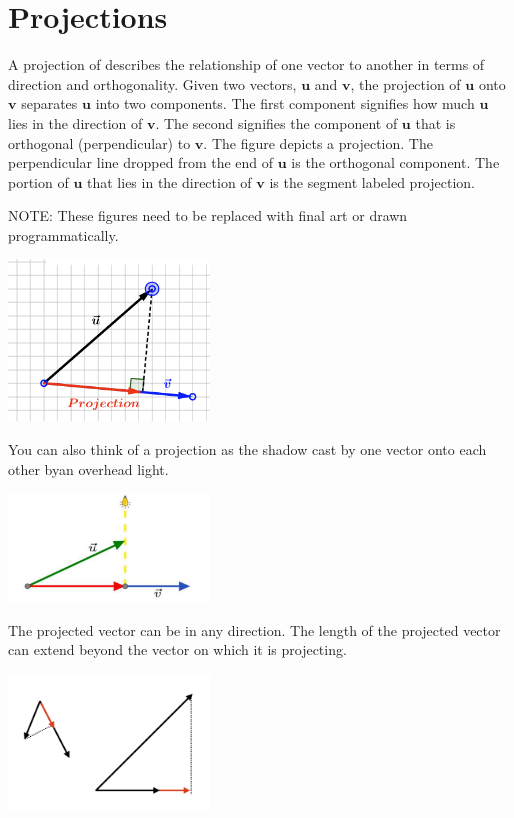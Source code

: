 \chapter{Projections}

A projection of describes the relationship of one vector to another in terms of direction and orthogonality. Given two vectors, $\mathbf{u}$ and $\mathbf{v}$, the projection of $\mathbf{u}$ onto $\mathbf{v}$ separates $\mathbf{u}$ into two components. The first component signifies how much $\mathbf{u}$ lies in the direction of $\mathbf{v}$. The second signifies the component of $\mathbf{u}$ that is orthogonal (perpendicular) to $\mathbf{v}$.  The figure depicts a projection. The perpendicular line dropped from the end of $\mathbf{u}$ is the orthogonal component. The portion of $\mathbf{u}$ that lies in the direction of $\mathbf{v}$ is the segment labeled projection. 

NOTE: These figures need to be replaced with final art or drawn programmatically.


\includegraphics[width=0.4\textwidth]{ProjectionFPO.png}

You can also think of a projection as the shadow cast by one vector onto each other byan overhead light.

\includegraphics[width=0.4\textwidth]{ProjectionBulbFPO.png}

The projected vector can be in any direction. The length of the projected vector can extend beyond the vector on which it is projecting.

\includegraphics[width=0.4\textwidth]{OtherExamplesFPO.png}

